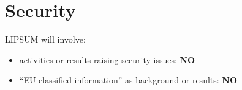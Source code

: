 \lipsum[1]


\section[Security]{Security}
\label{sec:security}

LIPSUM will involve:
\begin{itemize}
\item activities or results raising security issues: \textbf{NO}
\item ``EU-classified information'' as background or results: \textbf{NO}
\end{itemize}
